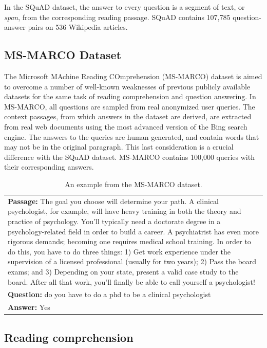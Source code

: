 \documentclass[11pt,a4paper]{article}
\begin{document}
In the SQuAD dataset, the answer to every question is a segment of text, or \textit{span}, from the corresponding reading passage. SQuAD contains
107,785 question-answer pairs on 536 Wikipedia articles.

\subsection{MS-MARCO Dataset}
\label{ssec:marco}

The Microsoft MAchine Reading COmprehension (MS-MARCO) \cite{msmarco:2016} dataset is aimed to overcome a number of well-known weaknesses of previous publicly available datasets for the same task of reading comprehension and question answering. In MS-MARCO, all questions are sampled from real anonymized user queries. The context passages, from which answers in the dataset are derived, are extracted from real web documents using the most advanced version of the Bing search engine. The answers to the queries are human generated, and contain words that may not be in the original paragraph. This last consideration is a crucial difference with the SQuAD dataset. MS-MARCO contains 100,000 queries with their corresponding answers.


\begin{table}
\centering
\begin{tabular}{|p{7cm}|}
 \hline
\textbf{Passage:} The goal you choose will determine your path. A clinical psychologist, for example, will have heavy training in both the theory and practice of psychology. You’ll typically need a doctorate degree in a psychology-related field in order to build a career. A psychiatrist has even more rigorous demands; becoming one requires medical school training. In order to do this, you have to do three things: 1) Get work experience under the supervision of a licensed professional (usually for two years); 2) Pass the board exams; and 3) Depending on your state, present a valid case study to the board. After all that work, you’ll finally be able to call yourself a psychologist! \\ 
\textbf{Question:} do you have to do a phd to be a clinical psychologist\\
\textbf{Answer:} Yes\\
 \hline
\end{tabular}
\caption{An example from the MS-MARCO dataset.
  }
\end{table}


\subsection{Reading comprehension}
\label{ssec:reading_comprehension}
\end{document}
